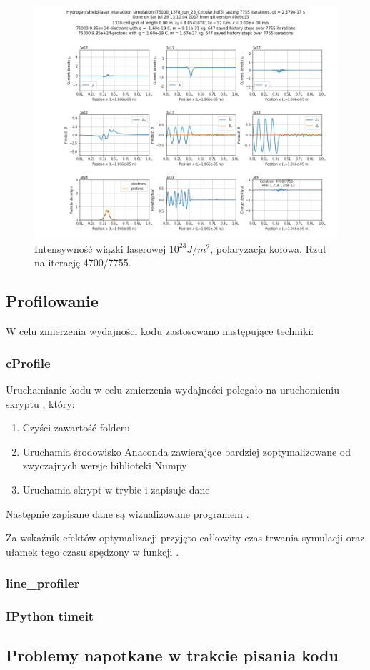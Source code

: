 \begin{figure}[h!]
  \includegraphics[width=\textwidth]{Images/75000_1378_run_23_Circular_004700}
  \caption{Intensywność wiązki laserowej $10^{23} J/m^2$, polaryzacja kołowa. Rzut na iterację 4700/7755.\label{fig:laser-23-Circular-snapshot}}
\end{figure}




\subsection{Profilowanie}
W celu zmierzenia wydajności kodu zastosowano następujące techniki:
\subsubsection{cProfile}
Uruchamianie kodu w celu zmierzenia wydajności polegało na uruchomieniu skryptu , który:
\begin{enumerate}
\item Czyści zawartość folderu 
\item Uruchamia środowisko Anaconda zawierające bardziej zoptymalizowane od zwyczajnych wersje biblioteki Numpy
\item Uruchamia skrypt  w trybie  i zapisuje dane
\end{enumerate}

Następnie zapisane dane są wizualizowane programem .

Za wskaźnik efektów optymalizacji przyjęto całkowity czas trwania symulacji oraz ułamek tego czasu spędzony w funkcji
.
\subsubsection{line\_profiler}
\subsubsection{IPython timeit}

\subsection{Problemy napotkane w trakcie pisania kodu} %
